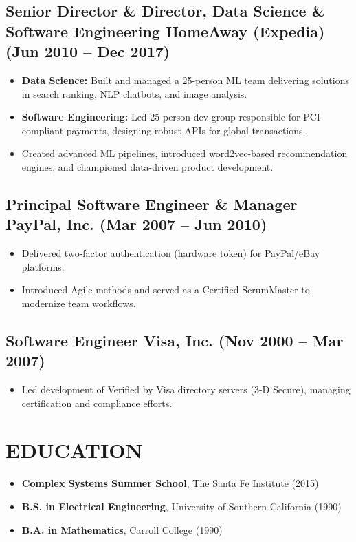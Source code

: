 \documentclass[11pt]{article}
\begin{document}
\subsection*{Senior Director \& Director, Data Science \& Software Engineering \hfill HomeAway (Expedia) (Jun 2010 -- Dec 2017)}
\begin{itemize}[leftmargin=*]
  \item \textbf{Data Science:} Built and managed a 25-person ML team delivering solutions in search ranking, NLP chatbots, and image analysis.
  \item \textbf{Software Engineering:} Led 25-person dev group responsible for PCI-compliant payments, designing robust APIs for global transactions.
  \item Created advanced ML pipelines, introduced word2vec-based recommendation engines, and championed data-driven product development.
\end{itemize}

\subsection*{Principal Software Engineer \& Manager \hfill PayPal, Inc. (Mar 2007 -- Jun 2010)}
\begin{itemize}[leftmargin=*]
  \item Delivered two-factor authentication (hardware token) for PayPal/eBay platforms.
  \item Introduced Agile methods and served as a Certified ScrumMaster to modernize team workflows.
\end{itemize}

\subsection*{Software Engineer \hfill Visa, Inc. (Nov 2000 -- Mar 2007)}
\begin{itemize}[leftmargin=*]
  \item Led development of Verified by Visa directory servers (3-D Secure), managing certification and compliance efforts.
\end{itemize}

\section*{EDUCATION}
\begin{itemize}[leftmargin=*]
  \item \textbf{Complex Systems Summer School}, The Santa Fe Institute (2015)
  \item \textbf{B.S. in Electrical Engineering}, University of Southern California (1990)
  \item \textbf{B.A. in Mathematics}, Carroll College (1990)
\end{itemize}
\end{document}
